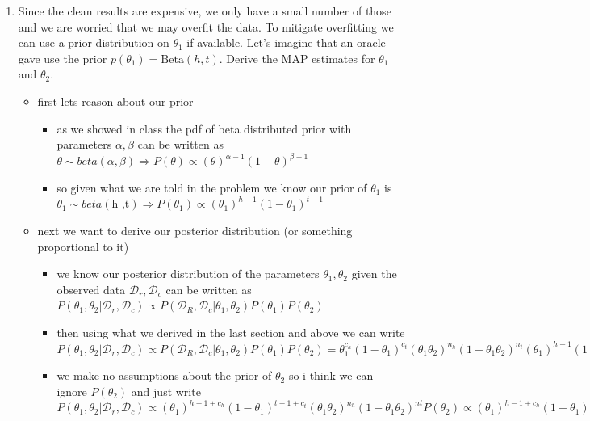\documentclass{article}
\theoremstyle{plain}
\theoremstyle{definition}
\begin{document}
\begin{enumerate}
\item Since the clean results are expensive, we only have a small number of those and we are worried that we may overfit the data.
To mitigate overfitting we can use a prior distribution on $\theta_1$ if available. Let's imagine that an oracle gave use the prior $p(\theta_1) = \text{Beta}(h, t)$.
Derive the MAP estimates for $\theta_1$ and $\theta_2$.
\begin{itemize}
    \color{blue}
    \item  first lets reason about our prior
    \begin{itemize}
        \item as we showed in class the pdf of beta distributed prior with parameters $\alpha, \beta$  can be written as $\theta\sim beta(\alpha, \beta)\Rightarrow P(\theta)\propto (\theta)^{\alpha-1}(1-\theta)^{\beta-1}$ 
        \item so given what we are told in the problem we know our prior of $\theta_1$ is $\theta_1\sim beta(\text{h ,t})\Rightarrow P(\theta_1)\propto (\theta_1)^{h-1}(1-\theta_1)^{t-1} $
    \end{itemize}
   \item next we want to derive our posterior distribution (or something proportional to it)
   \begin{itemize}
       \item we know our posterior distribution of the parameters $\theta_1, \theta_2$ given the observed data $\mathcal{D}_{r}, \mathcal{D}_{c}$ can be written as $P(\theta_1,\theta_2|\mathcal{D}_{r}, \mathcal{D}_{c})\propto P(\mathcal{D}_{R},\mathcal{D}_{c}|\theta_1,\theta_2)P(\theta_1)P(\theta_2)$
       \item then using what we derived in the last section and above we can write $P(\theta_1,\theta_2|\mathcal{D}_{r}, \mathcal{D}_{c})\propto P(\mathcal{D}_{R},\mathcal{D}_{c}|\theta_1,\theta_2)P(\theta_1)P(\theta_2)=\theta_1^{c_h}(1-\theta_1)^{c_t}(\theta_1\theta_2)^{n_h}(1-\theta_1\theta_2)^{n_t}(\theta_1)^{h-1}(1-\theta_1)^{t-1}P(\theta_2)=(\theta_1)^{h-1+c_h}(1-\theta_1)^{t-1+c_t}(\theta_1\theta_2)^{n_h}(1-\theta_1\theta_2)^{nt}P(\theta_2)$
       \item we make no assumptions about the prior of $\theta_2$ so i think we can ignore $P(\theta_2)$ and just write $P(\theta_1,\theta_2|\mathcal{D}_{r}, \mathcal{D}_{c})\propto (\theta_1)^{h-1+c_h}(1-\theta_1)^{t-1+c_t}(\theta_1\theta_2)^{n_h}(1-\theta_1\theta_2)^{nt}P(\theta_2)\propto (\theta_1)^{h-1+c_h}(1-\theta_1)^{t-1+c_t}(\theta_1\theta_2)^{n_h}(1-\theta_1\theta_2)^{nt}$

\end{itemize}
\end{itemize}
\end{enumerate}
\end{document}
